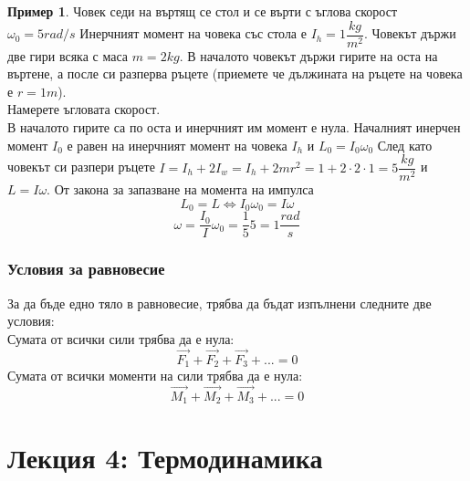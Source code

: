 \documentclass[fleqn, 12pt]{article}
\theoremstyle{definition}
\newtheorem{example}{Пример}[subsection]
\begin{document}
\begin{example}
Човек седи на въртящ се стол и се върти с ъглова скорост $ \omega_0 = 5 rad/s $ Инерчният момент на човека със стола е $I_h = 1 \dfrac{kg}{m^2}$. Човекът държи две гири всяка с маса $m = 2 kg$. В началото човекът държи гирите на оста на въртене, а после си разперва ръцете (приемете че дължината на ръцете на човека е $r = 1 m$).\\
Намерете ъгловата скорост.\\
В началото гирите са по оста и инерчният им момент е нула. Началният инерчен момент $I_0$ е равен на инерчният момент на човека $I_h$ и $L_0 = I_0 \omega_0$ След като човекът си разпери ръцете $I = I_h + 2I_w = I_h + 2mr^2 = 1 + 2 \cdot 2 \cdot 1 = 5 \dfrac{kg}{m^2}$ и $L = I \omega$. От закона за запазване на момента на импулса
$$L_0 = L \Leftrightarrow I_0 \omega_0 = I\omega$$
$$\omega = \dfrac{I_0}{I} \omega_0 = \dfrac{1}{5} 5 = 1 \dfrac{rad}{s}$$
\end{example}

\subsubsection{Условия за равновесие}
За да бъде едно тяло в равновесие, трябва да бъдат изпълнени следните две условия: \\
Сумата от всички сили трябва да е нула:
$$\vec{F_1} + \vec{F_2} + \vec{F_3} + ... = 0$$
Сумата от всички моменти на сили трябва да е нула:
$$\vec{M_1} + \vec{M_2} + \vec{M_3} + ... = 0$$

\newpage
\section{Лекция 4: Термодинамика}
\end{document}
